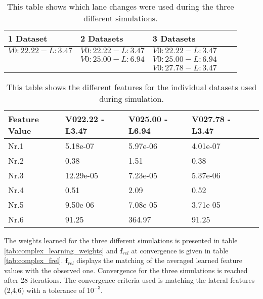 \begin{table}[h!]
	\centering
	\begin{tabular}{@{}llllr@{}} \toprule
		1 Dataset    & 2 Datasets & 3 Datasets\\ \midrule
     $V0:22.22 - L:3.47$  & $V0:22.22 - L:3.47$    & $V0:22.22 - L:3.47$ 		\\
           			 & $V0:25.00 - L:6.94$      & $V0:25.00 - L:6.94$      \\
	        		 &        & $V0:27.78 - L:3.47$      \\ \bottomrule
	\end{tabular}
	\caption{This table shows which lane changes were used during the three different simulations.}
	\label{tab:datasets_overview}
\end{table} 


\begin{table}[h!]
	\centering
	\begin{tabular}{@{}llllr@{}} \toprule
	\textbf{Feature Value}     & V022.22 - L3.47 & V025.00 - L6.94 & V027.78 - L3.47\\ \midrule
		Nr.1       		  &5.18e-07       & 5.97e-06  & 4.01e-07 		\\
		Nr.2              & 0.38       & 1.51       & 0.38       \\
		Nr.3              & 12.29e-05  & 7.23e-05      & 5.37e-06      \\
		Nr.4              & 0.51       & 2.09       &   0.52    \\
		Nr.5              & 9.50e-06       & 7.08e-05       & 3.71e-05       \\
		Nr.6              & 91.25      & 364.97       & 91.25       \\ \bottomrule
	\end{tabular}
	\caption{This table shows the different features for the individual datasets used during simulation.}
	\label{tab:indi_features}
\end{table} 

The weights learned for the three different simulations is presented in table \ref{tab:complex_learning_weights} and $\bm{f}_{rel}$ at convergence is given in table \ref{tab:complex_frel}.   $\bm{f}_{rel}$ displays the matching of the averaged learned feature values with the observed one. Convergence for the three simulations is reached after 28 iterations. The convergence criteria used is matching the lateral features (2,4,6) with a tolerance of $10^{-3}$.\\


